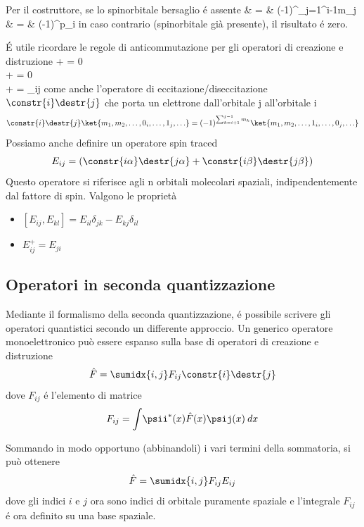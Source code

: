 Per il costruttore, se lo spinorbitale bersaglio \'e assente
\beqas
{}  & = &
(-1)^{\sum_{j=1}^{i-1}m_j}  \\
  & = &
(-1)^{p_i}
\eeqas
in caso contrario (spinorbitale gi\`a presente), il risultato \'e zero.

\'E utile ricordare le regole di anticommutazione per gli operatori di
creazione e distruzione
\beqas
{}+ = 0 \\
+ = 0 \\
+ = \delta_{ij}
\eeqas
come anche l'operatore di eccitazione/diseccitazione $\constr{i}\destr{j}$ che porta un
elettrone dall'orbitale j all'orbitale i
$$
\constr{i}\destr{j} \ket{m_1,m_2,\ldots,0_i,\ldots,1_j,\ldots} =
(-1)^{\sum_{k=i+1}^{j-1}m_k} \ket{m_1,m_2,\ldots,1_i,\ldots,0_j,\ldots}
$$
Possiamo anche definire un operatore spin traced
$$
E_{ij} = \left( \constr{i\alpha}\destr{j\alpha} +
\constr{i\beta}\destr{j\beta} \right)
$$
Questo operatore si riferisce agli n orbitali molecolari spaziali,
indipendentemente dal fattore di spin.
Valgono le propriet\`a
\begin{itemize}
\item $ \left[ E_{ij}, E_{kl} \right] = E_{il}\delta_{jk} -
E_{kj}\delta_{il} $
\item $ E^{+}_{ij} = E_{ji} $
\end{itemize}

\subsection{Operatori in seconda quantizzazione}

Mediante il formalismo della seconda quantizzazione, \'e possibile
scrivere gli operatori quantistici secondo un differente approccio.
Un generico operatore monoelettronico pu\`o essere espanso sulla base di
operatori di creazione e distruzione
$$
\hat{F} = \sumidx{i,j} F_{ij} \constr{i}\destr{j}
$$
dove $F_{ij}$ \'e l'elemento di matrice
$$
F_{ij} = \int \! \psii^{*}(x)\hat{F}(x)\psij(x) \: dx
$$

Sommando in modo opportuno (abbinandoli) i vari termini della
sommatoria, si pu\`o ottenere
$$
\hat{F} = \sumidx{i,j} F_{ij}E_{ij}
$$
dove gli indici $i$ e $j$ ora sono indici di orbitale puramente spaziale
e l'integrale $F_{ij}$ \'e ora definito su una base spaziale.

